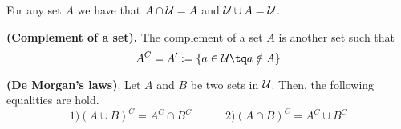 
\begin{remark}
    For any set $A$ we have that $A\cap\mathcal{U} = A$ and $\mathcal{U}\cup A = \mathcal{U}$.
\end{remark}
\begin{definition}
    \textbf{(Complement of a set).} The complement of a set $A$ is another set such that
    \begin{equation}
        A^C = A' :=\{a\in\uset\tq a\notin A\}
    \end{equation}
\end{definition}


\begin{proposition}
\textbf{(De Morgan's laws)}. Let $A$ and $B$ be two sets in $\mathcal{U}$. Then, the following equalities are hold.
\begin{equation}\label{demorgan:1}
    1) \left( A\cup B \right)^C = A^C\cap B^C \quad\quad\quad 2) \left( A\cap B \right)^C = A^C\cup B^C
\end{equation}
\end{proposition}

